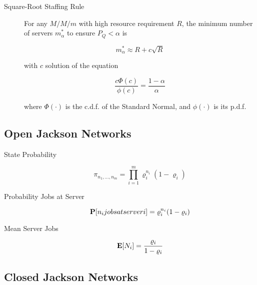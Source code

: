 \begin{description}
	
	\item [Square-Root Staffing Rule]
	For any $M/M/m$ with high resource requirement $R$, the minimum number of servers $m_{\alpha}^{*}$ to ensure $P_{Q} < \alpha$ is
	
	\begin{equation}
	m_{\alpha}^{*} \approx R + c \sqrt{R}
	\end{equation}
	
	with $c$ solution of the equation
	
	\begin{equation}
	\frac{c \Phi(c)}{\phi(c)} = \frac{1 - \alpha}{\alpha}
	\end{equation}	
	
	where
	$\Phi(\cdot)$ is the c.d.f. of the Standard Normal, and
	$\phi(\cdot)$ is its p.d.f.
\end{description}




\subsection{Open Jackson Networks}

\begin{description}
	
	\item [State Probability]
		\begin{equation}
		\pi_{n_{1},...,n_{m}} = \prod_{i=1}^{m} \varrho_{i}^{n_{i}} (1-\varrho_{i})
		\end{equation}
		
	\item [Probability Jobs at Server]
		\begin{equation}
		\mathbf{P}[n_{i} jobs at server i] = \varrho_{i}^{n_{i}} (1-\varrho_{i})
		\end{equation}
	
	\item [Mean Server Jobs]
		\begin{equation}
		\mathbf{E}[N_{i}] = \frac{\varrho_{i}}{1 - \varrho_{i}}
		\end{equation}
	
\end{description}




\subsection{Closed Jackson Networks}

